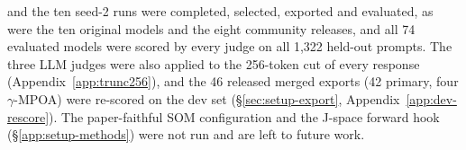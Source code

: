 \begin{itemize}
  and the ten seed-2 runs were completed, selected, exported and evaluated, as
  were the ten original models and the eight community releases, and all 74
  evaluated models were scored by every judge on all 1{,}322 held-out
  prompts. The three LLM judges were also applied to the 256-token cut of
  every response (Appendix~\ref{app:trunc256}), and the 46 released merged
  exports (42 primary, four $\gamma$-MPOA) were re-scored on the dev set
  (\S\ref{sec:setup-export}, Appendix~\ref{app:dev-rescore}). The
  paper-faithful SOM configuration and the J-space forward hook
  (\S\ref{app:setup-methods}) were not run and are left to future work.
\end{itemize}
